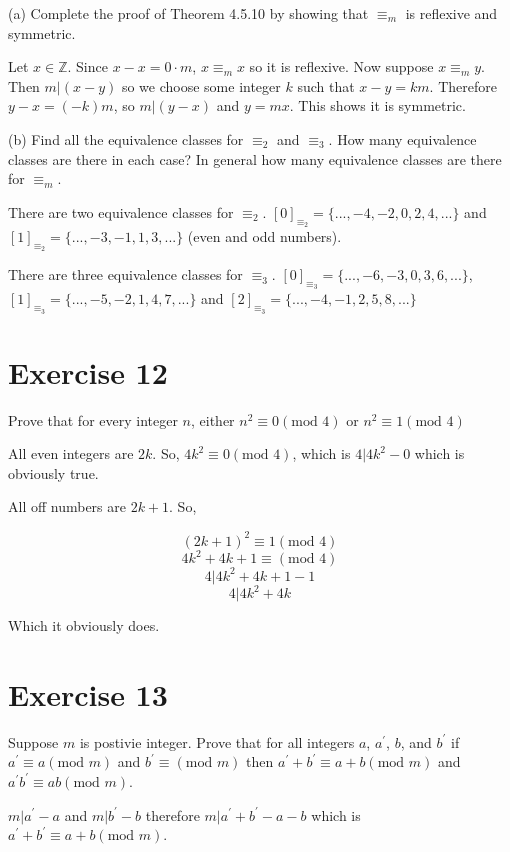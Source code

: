 \documentclass[11pt]{article}
\begin{document}
\noindent (a) Complete the proof of Theorem 4.5.10 by showing that $\equiv_m$ is 
reflexive and symmetric.

Let $x \in \mathbb{Z}$. Since $x-x = 0 \cdot m$, $x \equiv_m x$ so it is 
reflexive. Now suppose $x \equiv_m y$. Then $m | (x-y)$ so we choose some 
integer $k$ such that $x-y = km$. Therefore $y-x = (-k)m$, so $m|(y-x)$ and 
$y = mx$. This shows it is symmetric.

\noindent (b) Find all the equivalence classes for $\equiv_2$ and $\equiv_3$.
How many equivalence classes are there in each case? In general how many 
equivalence classes are there for $\equiv_m$.

There are two equivalence classes for $\equiv_2$. 
$[0]_{\equiv_2} = \{...,-4,-2,0,2,4,...\}$ and $[1]_{\equiv_2} = \{...,-3,-1,1,3,...\}$
(even and odd numbers).

There are three equivalence classes for $\equiv_3$. 
$[0]_{\equiv_3} = \{...,-6,-3,0,3,6,...\}$,
$[1]_{\equiv_3} = \{...,-5,-2,1,4,7,...\}$ and
$[2]_{\equiv_3} = \{...,-4,-1,2,5,8,...\}$

\section*{Exercise 12} Prove that for every integer $n$, 
either $n^2 \equiv 0 (\text{mod } 4)$ or $n^2 \equiv 1 (\text{mod } 4)$

All even integers are $2k$.  So, $4k^2 \equiv 0 (\text{mod } 4)$, which is 
$4 | 4k^2 - 0$ which is obviously true.

All off numbers are $2k+1$. So,

$$(2k+1)^2 \equiv 1 (\text{mod } 4)$$
$$4k^2 + 4k + 1 \equiv (\text{mod } 4)$$
$$4 | 4k^2 + 4k + 1 - 1$$
$$4 | 4k^2 + 4k$$

Which it obviously does.

\section*{Exercise 13}

Suppose $m$ is postivie integer. Prove that for all integers $a$, $a^\prime$,
$b$, and $b^\prime$ if $a^\prime \equiv a (\text{mod } m)$ and 
$b^\prime \equiv (\text{mod } m)$ then $a^\prime + b^\prime \equiv a + b (\text{mod } m)$
and $a^\prime b^\prime \equiv ab (\text{mod } m)$.

$m | a^\prime - a$ and $m | b^\prime - b$ therefore $m | a^\prime + b^\prime -a -b$
which is $a^\prime + b^\prime \equiv a + b (\text{mod } m)$.
\end{document}
